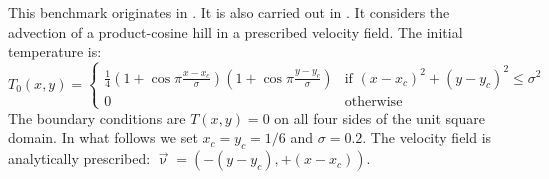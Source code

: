 This benchmark originates in \cite{dohu03}. It is also carried out in \cite{bepo10}.
It considers the advection of a product-cosine hill
in a prescribed velocity field. The initial temperature is:
\begin{equation}
T_0(x,y)=
\left\{
\begin{array}{cc}
\frac{1}{4}
\left(1+\cos \pi\frac{x-x_c}{\sigma}\right)
\left(1+\cos \pi\frac{y-y_c}{\sigma}\right)
& \text{if } (x-x_c)^2+(y-y_c)^2\leq \sigma^2 \\
0 & \text{otherwise}
\end{array}
\right.
\end{equation}
The boundary conditions are $T(x,y)=0$ on all four sides of the unit square domain. In what follows we set $x_c=y_c=1/6$ and $\sigma=0.2$.  The velocity field is analytically prescribed: $\vec\upnu=(-(y-y_c),+(x-x_c))$.

